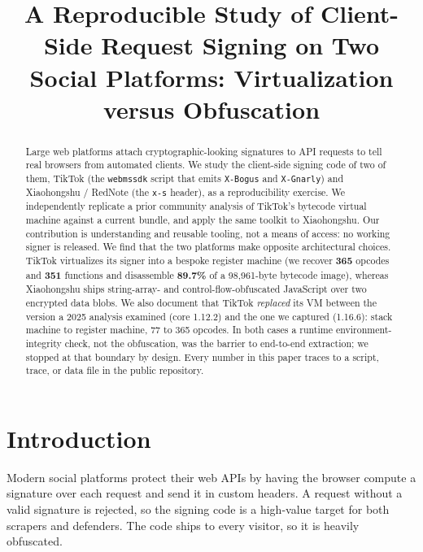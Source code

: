 \documentclass[conference,10pt]{IEEEtran}
\newcommand{\code}[1]{\texttt{\small #1}}
\begin{document}
\title{A Reproducible Study of Client-Side Request Signing on Two Social Platforms: Virtualization versus Obfuscation}

\author{
}

\maketitle

\begin{abstract}
Large web platforms attach cryptographic-looking signatures to API requests to tell real browsers from automated clients. We study the client-side signing code of two of them, TikTok (the \code{webmssdk} script that emits \code{X-Bogus} and \code{X-Gnarly}) and Xiaohongshu / RedNote (the \code{x-s} header), as a reproducibility exercise. We independently replicate a prior community analysis of TikTok's bytecode virtual machine against a current bundle, and apply the same toolkit to Xiaohongshu. Our contribution is understanding and reusable tooling, not a means of access: no working signer is released. We find that the two platforms make opposite architectural choices. TikTok virtualizes its signer into a bespoke register machine (we recover \textbf{365} opcodes and \textbf{351} functions and disassemble \textbf{89.7\%} of a 98{,}961-byte bytecode image), whereas Xiaohongshu ships string-array- and control-flow-obfuscated JavaScript over two encrypted data blobs. We also document that TikTok \emph{replaced} its VM between the version a 2025 analysis examined (core 1.12.2) and the one we captured (1.16.6): stack machine to register machine, 77 to 365 opcodes. In both cases a runtime environment-integrity check, not the obfuscation, was the barrier to end-to-end extraction; we stopped at that boundary by design. Every number in this paper traces to a script, trace, or data file in the public repository.
\end{abstract}

\section{Introduction}
Modern social platforms protect their web APIs by having the browser compute a signature over each request and send it in custom headers. A request without a valid signature is rejected, so the signing code is a high-value target for both scrapers and defenders. The code ships to every visitor, so it is heavily obfuscated.
\end{document}
